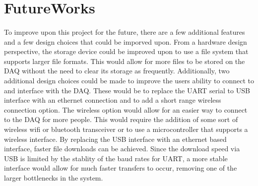\section{FutureWorks}

\paragraph{}
To improve upon this project for the future, there are a few additional features and a few design choices that could be imporved upon.
From a hardware design perspective, the storage device could be improved upon to use a file system that supports larger file formats.
This would allow for more files to be stored on the DAQ without the need to clear its storage as frequently.
Additionally, two additional design choices could be made to improve the users ability to connect to and interface with the DAQ.
These would be to replace the UART serial to USB interface with an ethernet connection and to add a short range wireless connection option.
The wireless option would allow for an easier way to connect to the DAQ for more people.
This would require the addition of some sort of wireless wifi or bluetooth transceiver or to use a microcontroller that supports a wireless interface.
By replacing the USB interface with an ethernet based interface, faster file downloads can be achieved.
Since the download speed via USB is limited by the stablity of the baud rates for UART, a more stable interface would allow for much faster transfers to occur, removing one of the larger bottlenecks in the system.
